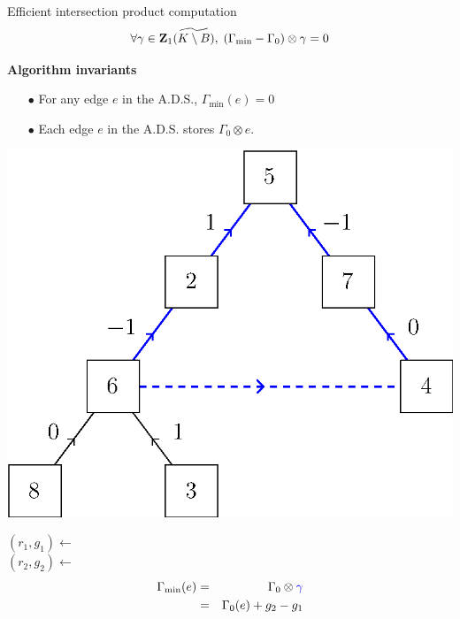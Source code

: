 \begin{frame}{Efficient intersection product computation}
	\small
	\[
		\forall \gamma \in \mathbf{Z}_1(\widetilde{K \setminus B}), \; (\Gamma_{\min} - \Gamma_0) \otimes \gamma = 0
	\]
	
	\pause
	\textbf{Algorithm invariants}
	\begin{itemize}
		\item[$\bullet$] For any edge $e$ in the A.D.S., $\Gamma_{\min}(e) = 0$
		\item[$\bullet$] Each edge $e$ in the A.D.S. stores $\Gamma_0 \otimes e$.
	\end{itemize}
		
	\pause
	\begin{minipage}{0.45\linewidth}
		\centering
		\includegraphics[width=\linewidth]{ds/augmented_disjoint_cycle}
	\end{minipage}%
	\hfill
	\begin{minipage}{0.45\linewidth}
	\pause $(r_1, g_1) \leftarrow$ \\
	\pause $(r_2, g_2) \leftarrow$ \\
	\pause \begin{eqnarray*} 
				\Gamma_{\min}(e) &=& \Gamma_0 \otimes {\color{blue}\gamma}  \\
								 &=& \Gamma_0(e) + g_2 - g_1
			\end{eqnarray*}
	\end{minipage}
\end{frame}

